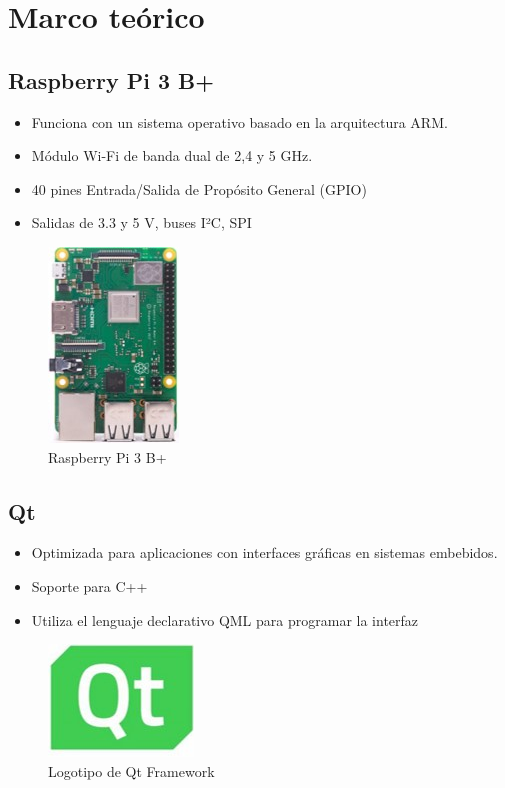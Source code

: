 \documentclass[12pt, twoside]{report}
\begin{document}
\newpage
\section{Marco teórico}

\subsection*{Raspberry Pi 3 B+}
\begin{itemize}
	\item Funciona con un sistema operativo basado en la arquitectura ARM.
	\item Módulo Wi-Fi de banda dual de 2,4 y 5 GHz.
	\item 40 pines Entrada/Salida de Propósito General (GPIO)
	\item Salidas de 3.3 y 5 V, buses I²C, SPI
\end{itemize}

\begin{figure}[htb]
	\centering
	\includegraphics[scale=0.5]{raspberrypi.jpg}
	\caption{Raspberry Pi 3 B+}
\end{figure}

\subsection*{Qt}
\begin{itemize}
	\item Optimizada para aplicaciones con interfaces gráficas en sistemas embebidos.
	\item Soporte para C++
	\item Utiliza el lenguaje declarativo QML para programar la interfaz
\end{itemize}

\begin{figure}[htb]
	\centering
	\includegraphics[scale=0.5]{qt.jpg}
	\caption{Logotipo de Qt Framework}
\end{figure}
\end{document}
